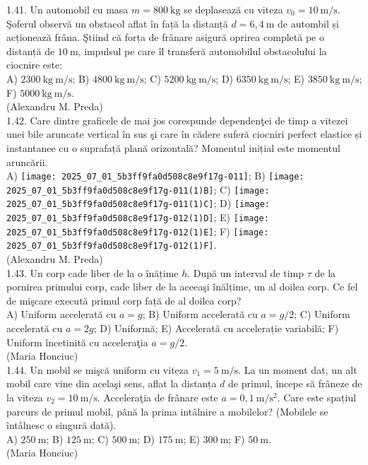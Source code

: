 1.41. Un automobil cu masa $m=800 \mathrm{~kg}$ se deplasează cu viteza $v_{0}=10 \mathrm{~m} / \mathrm{s}$. Şoferul observă un obstacol aflat în față la distanță $d=6,4 \mathrm{~m}$ de autombil și acționează frâna. Ştiind că forța de frânare asigură oprirea completă pe o distanță de $10 \mathrm{~m}$, impulsul pe care îl transferă automobilul obstacolului la ciocnire este:\\ A) $2300 \mathrm{~kg} \mathrm{~m} / \mathrm{s}$; B) $4800 \mathrm{~kg} \mathrm{~m} / \mathrm{s}$; C) $5200 \mathrm{~kg} \mathrm{~m} / \mathrm{s}$; D) $6350 \mathrm{~kg} \mathrm{~m} / \mathrm{s}$; E) $3850 \mathrm{~kg} \mathrm{~m} / \mathrm{s}$; F) $5000 \mathrm{~kg} \mathrm{~m} / \mathrm{s}$.\\ (Alexandru M. Preda)\\

1.42. Care dintre graficele de mai jos corespunde dependenţei de timp a vitezei unei bile aruncate vertical în sus şi care în cădere suferă ciocniri perfect elastice și instantanee cu o suprafață plană orizontală? Momentul inițial este momentul aruncării.\\ A) \texttt{[image: 2025\_07\_01\_5b3ff9fa0d508c8e9f17g-011]}; B) \texttt{[image: 2025\_07\_01\_5b3ff9fa0d508c8e9f17g-011(1)B]}; C) \texttt{[image: 2025\_07\_01\_5b3ff9fa0d508c8e9f17g-011(1)C]}; D) \texttt{[image: 2025\_07\_01\_5b3ff9fa0d508c8e9f17g-012(1)D]}; E) \texttt{[image: 2025\_07\_01\_5b3ff9fa0d508c8e9f17g-012(1)E]}; F) \texttt{[image: 2025\_07\_01\_5b3ff9fa0d508c8e9f17g-012(1)F]}.\\ (Alexandru M. Preda)\\

1.43. Un corp cade liber de la o înățime $h$. După un interval de timp $\tau$ de la pornirea primului corp, cade liber de la aceeaşi înălțime, un al doilea corp. Ce fel de mişcare execută primul corp față de al doilea corp?\\ A) Uniform accelerată cu $a=g$; B) Uniform acceleratã cu $a=g / 2$; C) Uniform accelerată cu $a=2 g$; D) Uniformă; E) Accelerată cu accelerație variabilă; F) Uniform încetinită cu acceleraţia $a=g / 2$.\\ (Maria Honciuc)\\

1.44. Un mobil se mişcă uniform cu viteza $v_{1}=5 \mathrm{~m} / \mathrm{s}$. La un moment dat, un alt mobil care vine din acelaşi sens, aflat la distanța $d$ de primul, începe să frâneze de la viteza $v_{2}=10 \mathrm{~m} / \mathrm{s}$. Acceleraţia de frânare este $a=0,1 \mathrm{~m} / \mathrm{s}^{2}$. Care este spațiul parcurs de primul mobil, până la prima intâlnire a mobilelor? (Mobilele se întâlnesc o singură dată).\\ A) $250 \mathrm{~m}$; B) $125 \mathrm{~m}$; C) $500 \mathrm{~m}$; D) $175 \mathrm{~m}$; E) $300 \mathrm{~m}$; F) $50 \mathrm{~m}$.\\ (Maria Honciuc)\\

